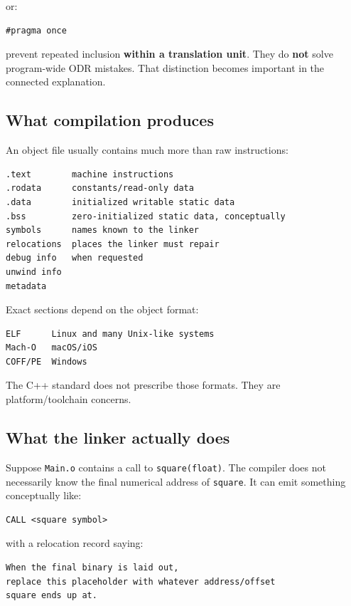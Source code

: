 or:

\begin{verbatim}
#pragma once
\end{verbatim}

prevent repeated inclusion \textbf{within a translation unit}. They do \textbf{not} solve program-wide ODR mistakes. That distinction becomes important in the connected explanation.

\subsection{What compilation produces}\label{05-engine-i-ch002-what-compilation-produces}

An object file usually contains much more than raw instructions:

\begin{verbatim}
.text        machine instructions
.rodata      constants/read-only data
.data        initialized writable static data
.bss         zero-initialized static data, conceptually
symbols      names known to the linker
relocations  places the linker must repair
debug info   when requested
unwind info
metadata
\end{verbatim}

Exact sections depend on the object format:

\begin{verbatim}
ELF      Linux and many Unix-like systems
Mach-O   macOS/iOS
COFF/PE  Windows
\end{verbatim}

The C++ standard does not prescribe those formats. They are platform/toolchain concerns.

\subsection{What the linker actually does}\label{05-engine-i-ch002-what-the-linker-actually-does}

Suppose \texttt{Main.o} contains a call to \texttt{square(float)}. The compiler does not necessarily know the final numerical address of \texttt{square}. It can emit something conceptually like:

\begin{verbatim}
CALL <square symbol>
\end{verbatim}

with a relocation record saying:

\begin{verbatim}
When the final binary is laid out,
replace this placeholder with whatever address/offset
square ends up at.
\end{verbatim}

